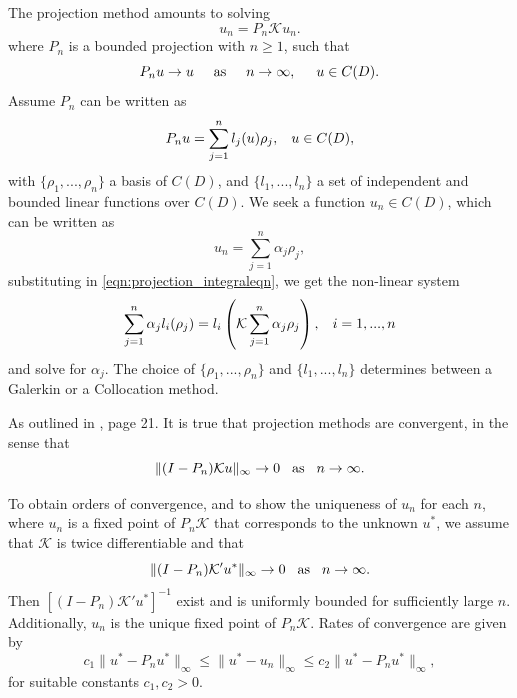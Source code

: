 \documentclass{uonmathreport}
\begin{document}
The projection method amounts to solving 
\begin{equation}\label{eqn:projection_integraleqn}
u_n = P_n\mathcal{K}u_n.
\end{equation}
where $P_n$ is a bounded projection with $n \geq 1$, such that
\begin{equation}
P_nu \rightarrow u \hspace{5mm} \textnormal{as} \hspace{5mm} n \rightarrow \infty, \hspace{5mm} u \in C(D).
\end{equation}
Assume $P_n$ can be written as
\begin{equation}
P_nu = \sum_{j=1}^{n} l_j(u)\rho_j,  \hspace{3mm} u \in C(D),
\end{equation}
with $\{\rho_1,...,\rho_n\}$ a basis of $C(D)$, and $\{l_1,...,l_n\}$ a set of independent and bounded linear functions over $C(D)$. We seek a function $u_n \in C(D)$, which can be written as
\begin{equation}
u_n = \sum_{j=1}^{n} \alpha_j \rho_j,
\end{equation}
substituting in \ref{eqn:projection_integraleqn}, we get the non-linear system 
\begin{equation}
\sum_{j=1}^{n} \alpha_j l_i(\rho_j) = 
l_i\left( \mathcal{K} \sum_{j=1}^{n} \alpha_j \rho_j\right), \hspace{3mm} i=1,...,n
\end{equation}
and solve for $\alpha_j$. The choice of $\{\rho_1,...,\rho_n\}$ and $\{l_1,...,l_n\}$ determines between a Galerkin or a Collocation method.

As outlined in \cite{atkinson1992survey}, page 21. It is true that projection methods are convergent, in the sense that
\begin{equation}
	\| (I - P_n)\mathcal{K}u\|_{\infty} \rightarrow 0 \hspace{3mm} \textnormal{as} \hspace{3mm} n \rightarrow \infty.
\end{equation}

To obtain orders of convergence, and to show the uniqueness of $u_n$ for each $n$, where $u_n$ is a fixed point of $P_n\mathcal{K}$ that corresponds to the unknown $u^*$, we assume that $\mathcal{K}$ is twice differentiable and that
\begin{equation}
	\| (I - P_n)\mathcal{K}'u^*\|_{\infty} \rightarrow 0 \hspace{3mm} \textnormal{as} \hspace{3mm} n \rightarrow \infty.
\end{equation}
Then $[(I - P_n)\mathcal{K}'u^* ]^{-1}$ exist and is uniformly bounded for sufficiently large $n$. Additionally, $u_n$ is the unique fixed point of $P_n\mathcal{K}$. Rates of convergence are given by
\begin{equation}
	c_1 \| u^* - P_n u^* \|_{\infty} \leq \|u^* - u_n \|_{\infty} \leq c_2\| u^* - P_n u^* \|_{\infty},
\end{equation}
for suitable constants $c_1, c_2 > 0.$
\end{document}
